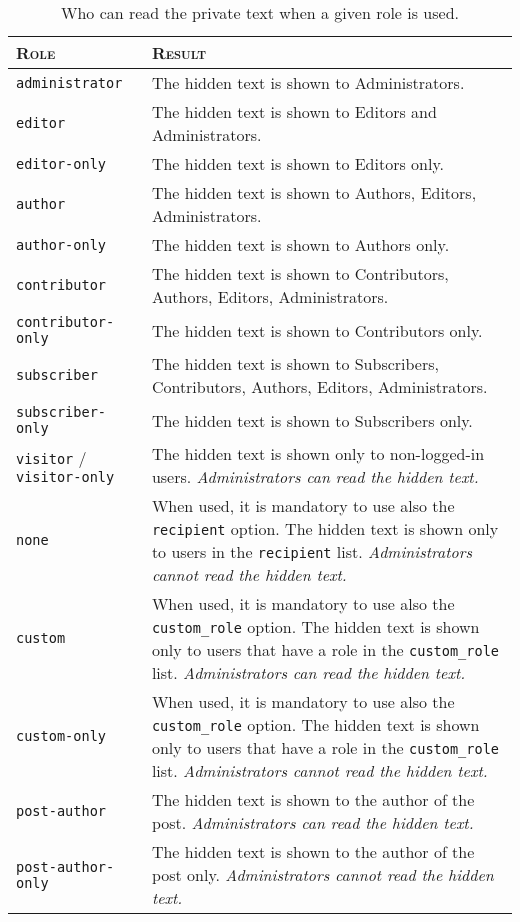 \begin{table}
 \centering
 \begin{tabular}[t]{l p{7cm}}
 \toprule
 \textsc{Role} & \textsc{Result} \\
 \midrule
 \verb+administrator+ & The hidden text is shown to Administrators. \\
 \verb+editor+ & The hidden text is shown to Editors and Administrators. \\
 \verb+editor-only+ & The hidden text is shown to Editors only. \\
 \verb+author+ & The hidden text is shown to Authors, Editors, Administrators.
 \\
 \verb+author-only+ & The hidden text is shown to Authors only. \\
 \verb+contributor+ & The hidden text is shown to Contributors, Authors,
 Editors, Administrators. \\
 \verb+contributor-only+ & The hidden text is shown to Contributors only. \\
 \verb+subscriber+ & The hidden text is shown to Subscribers, Contributors,
 Authors, Editors, Administrators. \\
 \verb+subscriber-only+ & The hidden text is shown to Subscribers only. \\
 \verb+visitor+ / \verb+visitor-only+ & The hidden text is shown only to
 non-logged-in users. \textit{Administrators can read the hidden text.} \\
 \verb+none+ & When used, it is mandatory to use also the \verb+recipient+
 option. The hidden text is shown only to users in the \verb+recipient+ list.
 \textit{Administrators cannot read the hidden text.} \\
 \verb+custom+ & When used, it is mandatory to use also the \verb+custom_role+
 option. The hidden text is shown only to users that have a role in the
 \verb+custom_role+ list. \textit{Administrators can read the hidden text.} \\
 \verb+custom-only+ & When used, it is mandatory to use also the
 \verb+custom_role+ option. The hidden text is shown only to users that have a
 role in the \verb+custom_role+ list. \textit{Administrators cannot read the
 hidden text.} \\
 \verb+post-author+ & The hidden text is shown to the author of the post.
 \textit{Administrators can read the hidden text.} \\
 \verb+post-author-only+ & The hidden text is shown to the author of the post
 only. \textit{Administrators cannot read the hidden text.} \\
 \bottomrule
 \end{tabular}
 \caption{Who can read the private text when a given role is used.}
 \label{table:roles}
\end{table}

